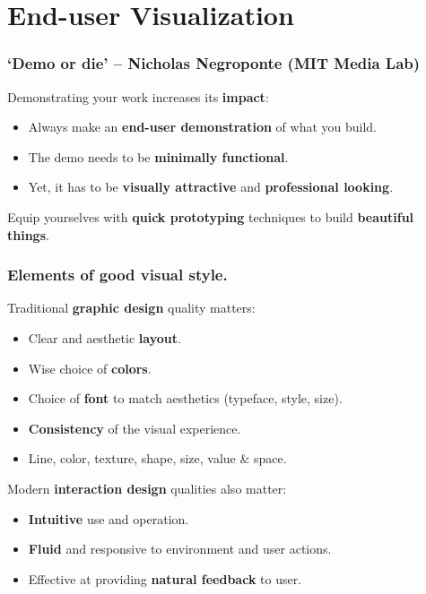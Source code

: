 \documentclass{beamer} %
\newcommand\emc[1]{\textcolor{brightblue}{\textbf{#1}}}
\begin{document}
\section{End-user Visualization}

\begin{frame}

\frametitle{`Demo or die' -- Nicholas Negroponte (MIT Media Lab)}

Demonstrating your work increases its \emc{impact}:
\begin{itemize}
  \item Always make an \emc{end-user demonstration} of what you build.
  \item The demo needs to be \emc{minimally functional}.
  \item Yet, it has to be \emc{visually attractive} and \emc{professional looking}.
\end{itemize}

\vspace{3mm}
Equip yourselves with \emc{quick prototyping} techniques to build \emc{beautiful things}.

\end{frame}

\begin{frame}

\frametitle{Elements of good visual style.}

Traditional \emc{graphic design} quality matters:
\begin{itemize}
  \item Clear and aesthetic \emc{layout}.
  \item Wise choice of \emc{colors}.
  \item Choice of \emc{font} to match aesthetics (typeface, style, size).
  \item \emc{Consistency} of the visual experience.
  \item Line, color, texture, shape, size, value \& space.
\end{itemize}

Modern \emc{interaction design} qualities also matter:
\begin{itemize}
  \item \emc{Intuitive} use and operation.
  \item \emc{Fluid} and responsive to environment and user actions.
  \item Effective at providing \emc{natural feedback} to user.
\end{itemize}

\end{frame}
\end{document}
